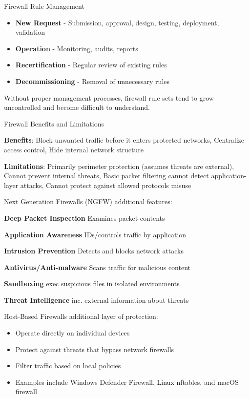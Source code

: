 \begin{concept}{Firewall Rule Management}
\begin{itemize}
    \item \textbf{New Request} - Submission, approval, design, testing, deployment, validation
    \item \textbf{Operation} - Monitoring, audits, reports
    \item \textbf{Recertification} - Regular review of existing rules
    \item \textbf{Decommissioning} - Removal of unnecessary rules
\end{itemize}
Without proper management processes, firewall rule sets tend to grow uncontrolled and become difficult to understand.
\end{concept}

\begin{theorem}{Firewall Benefits and Limitations}

    \textbf{Benefits}:
    Block unwanted traffic before it enters protected networks, Centralize access control, Hide internal network structure

\textbf{Limitations}:
Primarily perimeter protection (assumes threats are external), Cannot prevent internal threats, Basic packet filtering cannot detect application-layer attacks,
Cannot protect against allowed protocols misuse

\end{theorem}






\begin{definition}{Next Generation Firewalls (NGFW)}
additional features:

\textbf{Deep Packet Inspection} Examines packet contents

\textbf{Application Awareness} IDs/controls traffic by application

\textbf{Intrusion Prevention} Detects and blocks network attacks

\textbf{Antivirus/Anti-malware} Scans traffic for malicious content

\textbf{Sandboxing} exec suspicious files in isolated environments

\textbf{Threat Intelligence} inc. external information about threats

\end{definition}



\begin{definition}{Host-Based Firewalls}
additional layer of protection:
\begin{itemize}
    \item Operate directly on individual devices
    \item Protect against threats that bypass network firewalls
    \item Filter traffic based on local policies
    \item Examples include Windows Defender Firewall, Linux nftables, and macOS firewall
\end{itemize}
\end{definition}

